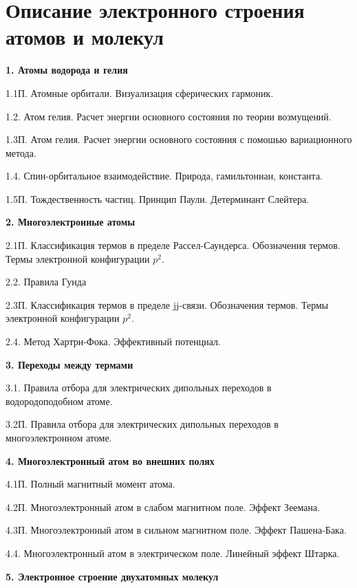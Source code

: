 \setmainfont{Noto Serif}
\setsansfont{Noto Sans}
\setmonofont{Noto Sans Mono}

\newpage
\section[Описание электронного строения  атомов и молекул]{\texorpdfstring{Описание электронного строения атомов и молекул}{Описание электронного строения  атомов и молекул}}
\textbf{1. Атомы водорода и гелия}\par
1.1П. Атомные орбитали. Визуализация сферических гармоник.\par
1.2. Атом гелия. Расчет энергии основного состояния по теории возмущений.\par
1.3П. Атом гелия. Расчет энергии основного состояния с помошью вариационного метода.\par
1.4. Спин-орбитальное взаимодействие. Природа, гамильтониан, константа.\par
1.5П. Тождественность частиц. Принцип Паули. Детерминант Слейтера.\par
\textbf{2. Многоэлектронные атомы}\par
2.1П. Классификация термов в пределе Рассел-Саундерса. Обозначения термов. Термы электронной конфигурации $p^2$.\par
2.2. Правила Гунда\par
2.3П. Классификация термов в пределе jj-связи. Обозначения термов. Термы электронной конфигурации $p^2$.\par
2.4. Метод Хартри-Фока. Эффективный потенциал.\par
\textbf{3. Переходы между термами}\par
3.1. Правила отбора для электрических дипольных переходов в водородоподобном атоме.\par
3.2П. Правила отбора для электрических дипольных переходов в многоэлектронном атоме.\par
\textbf{4. Многоэлектронный атом во внешних полях}\par
4.1П. Полный магнитный момент атома.\par
4.2П. Многоэлектронный атом в слабом магнитном поле. Эффект Зеемана.\par
4.3П. Многоэлектронный атом в сильном магнитном поле. Эффект Пашена-Бака.\par
4.4. Многоэлектронный атом в электрическом поле. Линейный эффект Штарка.\par
\textbf{5. Электронное строение двухатомных молекул}\par
